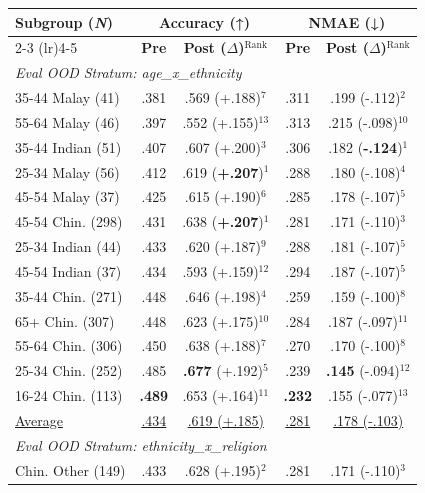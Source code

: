 \begin{tabular}{@{} p{2.6cm} | c c | c c @{}}
\toprule
\multirow{2}{*}{\textbf{Subgroup (\textbf{\textit{N}})}} & \multicolumn{2}{c|}{\textbf{Accuracy (↑)}} & \multicolumn{2}{c}{\textbf{NMAE (↓)}} \\
\cmidrule(lr){2-3} \cmidrule(lr){4-5}
& \textbf{Pre} & \textbf{Post ($\Delta$)}$^{\text{Rank}}$ & \textbf{Pre} & \textbf{Post ($\Delta$)}$^{\text{Rank}}$ \\
\midrule
\multicolumn{5}{l}{\textit{Eval OOD Stratum: age\_x\_ethnicity}} \\
\midrule
35-44 Malay (41) & .381 & .569 (+.188)$^{7}$ & .311 & .199 (-.112)$^{2}$ \\
55-64 Malay (46) & .397 & .552 (+.155)$^{13}$ & .313 & .215 (-.098)$^{10}$ \\
35-44 Indian (51) & .407 & .607 (+.200)$^{3}$ & .306 & .182 (\textbf{-.124})$^{1}$ \\
25-34 Malay (56) & .412 & .619 (\textbf{+.207})$^{1}$ & .288 & .180 (-.108)$^{4}$ \\
45-54 Malay (37) & .425 & .615 (+.190)$^{6}$ & .285 & .178 (-.107)$^{5}$ \\
45-54 Chin. (298) & .431 & .638 (\textbf{+.207})$^{1}$ & .281 & .171 (-.110)$^{3}$ \\
25-34 Indian (44) & .433 & .620 (+.187)$^{9}$ & .288 & .181 (-.107)$^{5}$ \\
45-54 Indian (37) & .434 & .593 (+.159)$^{12}$ & .294 & .187 (-.107)$^{5}$ \\
35-44 Chin. (271) & .448 & .646 (+.198)$^{4}$ & .259 & .159 (-.100)$^{8}$ \\
65+ Chin. (307) & .448 & .623 (+.175)$^{10}$ & .284 & .187 (-.097)$^{11}$ \\
55-64 Chin. (306) & .450 & .638 (+.188)$^{7}$ & .270 & .170 (-.100)$^{8}$ \\
25-34 Chin. (252) & .485 & \textbf{.677} (+.192)$^{5}$ & .239 & \textbf{.145} (-.094)$^{12}$ \\
16-24 Chin. (113) & \textbf{.489} & .653 (+.164)$^{11}$ & \textbf{.232} & .155 (-.077)$^{13}$ \\
\midrule
\underline{Average} & \underline{.434} & \underline{.619 (+.185)} & \underline{.281} & \underline{.178 (-.103)} \\
\midrule
\multicolumn{5}{l}{\textit{Eval OOD Stratum: ethnicity\_x\_religion}} \\
\midrule
Chin. Other (149) & .433 & .628 (+.195)$^{2}$ & .281 & .171 (-.110)$^{3}$ \\

\end{tabular}
